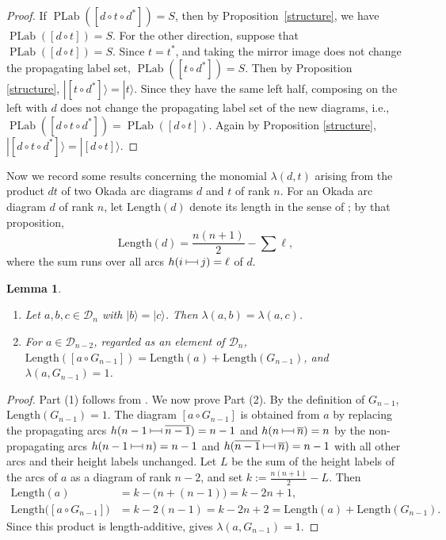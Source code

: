 \documentclass[12pt,reqno]{amsart}
\numberwithin{equation}{section}
\newtheorem{lemma}[theorem]{Lemma}
\theoremstyle{definition}
\theoremstyle{definition}
\newcommand{\PLab}{\operatorname{PLab}}
\newcommand{\arcjoin}{\mathrel{%
  \rule[0.1ex]{0.4pt}{1.1ex}%
  \rule[0.6ex]{1em}{0.4pt}%
  \rule[0.1ex]{0.4pt}{1.1ex}%
}}
\begin{document}
\begin{proof}
   If $\PLab([ d \circ t \circ d^*])=S$, then by Proposition~\ref{structure}, we have $\PLab([d \circ t])=S$. For the other direction, suppose that $\PLab([d \circ t])=S$. Since $t =t^*$, and taking the mirror image does not change the propagating label set, $\PLab([t \circ d^*])=S$. Then by Proposition \ref{structure}, $| [t \circ d^*] \rangle = | t \rangle$. Since they have the same left half, composing on the left with $d$ does not change the propagating label set of the new diagrams, i.e., $\PLab([d \circ t \circ d^*])=\PLab([d \circ t])$. Again by Proposition \ref{structure}, $| [d \circ t \circ d^*] \rangle = | [d \circ t] \rangle$.
\end{proof}
Now we record some results concerning the monomial $\lambda(d,t)$ arising from the product $dt$ of two Okada arc diagrams $d$ and $t$ of rank $n$. For an Okada arc diagram $d$ of rank $n$, let $\mathrm{Length}(d)$ denote its length in the sense of \cite[Proposition~5.27]{HivertScott}; by that proposition, 
\[ 
\mathrm{Length}(d)= \frac{n(n+1)}{2}- \sum \ell,
\] where the sum runs over all arcs $h(i \arcjoin j)=\ell$ of $d$.
\begin{lemma}\label{properties of lambda}
\begin{enumerate}
\item Let $a,b,c\in\mathcal D_n$ with $|b\rangle=|c\rangle$. Then
$\lambda(a,b)=\lambda(a,c)$.
\item For $a\in\mathcal D_{n-2}$, regarded as an element of $\mathcal D_n$,
$\mathrm{Length}([a\circ G_{n-1}])=\mathrm{Length}(a)+\mathrm{Length}(G_{n-1})$,
and $\lambda(a,G_{n-1})=1$.
\end{enumerate}
\end{lemma}
\begin{proof}
    Part (1) follows from \cite[Remark 6.4]{HivertScott}. We now prove Part (2).
By the definition of $G_{n-1}$, $\mathrm{Length}(G_{n-1})=1$. The diagram $[a \circ G_{n-1}]$ is obtained from $a$ by replacing the propagating arcs $h( n-1 \arcjoin \overline{n-1})=n-1$ and $h(n \arcjoin \overline{n})=n$ by the non-propagating arcs $h(n-1 \arcjoin n)=n-1$ and $h(\overline{n-1} \arcjoin \overline{n})=n-1$ with all other arcs and their height labels unchanged.  Let $L$ be the sum of the height labels of the arcs of $a$ as a diagram of rank $n-2$, and set $k:= \frac{n(n+1)}{2}-L$. Then 
\begin{align*}
\mathrm{Length}(a)
  &= k-\bigl(n+(n-1)\bigr) = k-2n+1,\\
\mathrm{Length}\bigl([a\circ G_{n-1}]\bigr)
  &= k-2(n-1) = k-2n+2
   = \mathrm{Length}(a)+\mathrm{Length}(G_{n-1}).
\end{align*}
Since this product is length-additive, \cite[Proposition 6.2]{HivertScott} gives
$\lambda(a,G_{n-1})=1$.
\end{proof}
\end{document}
